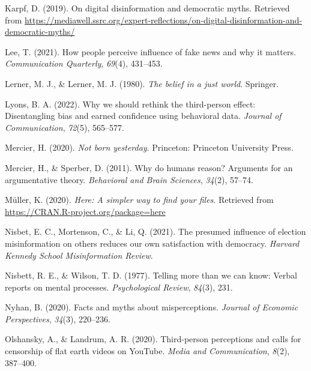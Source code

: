 \documentclass[
  ,jou,floatsintext]{apa6}
\newlength{\cslhangindent}
\newlength{\cslentryspacingunit} %
\newenvironment{CSLReferences}[2] %
 {%
  \setlength{\parindent}{0pt}
  \ifodd #1
  \let\oldpar\par
  \def\par{\hangindent=\cslhangindent\oldpar}
  \fi
  \setlength{\parskip}{#2\cslentryspacingunit}
 }%
 {}
\begin{document}
\begin{CSLReferences}{1}{0}
\leavevmode{}%
Karpf, D. (2019). On digital disinformation and democratic myths. Retrieved from \url{https://mediawell.ssrc.org/expert-reflections/on-digital-disinformation-and-democratic-myths/}

\leavevmode{}%
Lee, T. (2021). How people perceive influence of fake news and why it matters. \emph{Communication Quarterly}, \emph{69}(4), 431--453.

\leavevmode{}%
Lerner, M. J., \& Lerner, M. J. (1980). \emph{The belief in a just world}. Springer.

\leavevmode{}%
Lyons, B. A. (2022). Why we should rethink the third-person effect: Disentangling bias and earned confidence using behavioral data. \emph{Journal of Communication}, \emph{72}(5), 565--577.

\leavevmode{}%
Mercier, H. (2020). \emph{Not born yesterday}. Princeton: Princeton University Press.

\leavevmode{}%
Mercier, H., \& Sperber, D. (2011). Why do humans reason? Arguments for an argumentative theory. \emph{Behavioral and Brain Sciences}, \emph{34}(2), 57--74.

\leavevmode{}%
Müller, K. (2020). \emph{Here: A simpler way to find your files}. Retrieved from \url{https://CRAN.R-project.org/package=here}

\leavevmode{}%
Nisbet, E. C., Mortenson, C., \& Li, Q. (2021). The presumed influence of election misinformation on others reduces our own satisfaction with democracy. \emph{Harvard Kennedy School Misinformation Review}.

\leavevmode{}%
Nisbett, R. E., \& Wilson, T. D. (1977). Telling more than we can know: Verbal reports on mental processes. \emph{Psychological Review}, \emph{84}(3), 231.

\leavevmode{}%
Nyhan, B. (2020). Facts and myths about misperceptions. \emph{Journal of Economic Perspectives}, \emph{34}(3), 220--236.

\leavevmode{}%
Olshansky, A., \& Landrum, A. R. (2020). Third-person perceptions and calls for censorship of flat earth videos on YouTube. \emph{Media and Communication}, \emph{8}(2), 387--400.


\end{CSLReferences}
\end{document}
